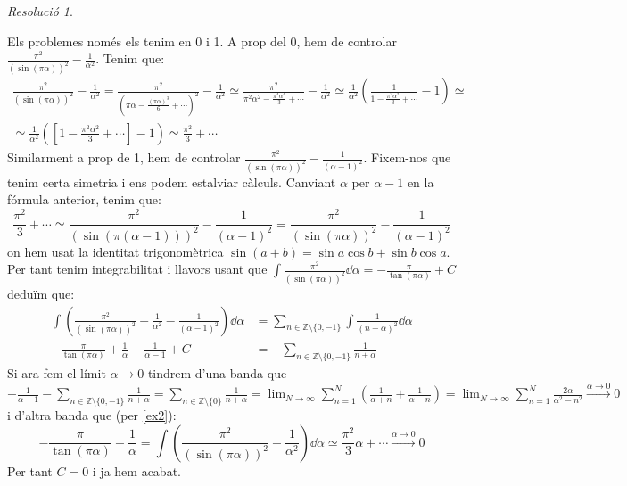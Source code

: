 \documentclass[10pt,a4paper]{article}
\newcommand{\ZZ}{\ensuremath{\mathbb{Z}}} %
\theoremstyle{definition}
\theoremstyle{remark}
\newtheorem*{res}{Resolució}
\begin{document}
\begin{res}
\begin{enumerate}
          Els problemes només els tenim en 0 i 1. A prop del 0, hem de controlar $\frac{\pi^2}{{(\sin(\pi\alpha))}^2}-\frac{1}{\alpha^2}$. Tenim que:
          \begin{multline}\label{ex2}
            \frac{\pi^2}{{(\sin(\pi\alpha))}^2}-\frac{1}{\alpha^2}= \frac{\pi^2}{{(\pi\alpha-\frac{{(\pi\alpha)}^3}{6}+\cdots)}^2}-\frac{1}{\alpha^2}\simeq \frac{\pi^2}{\pi^2\alpha^2-\frac{\pi^4\alpha^4}{3}+\cdots}-\frac{1}{\alpha^2}\simeq \frac{1}{\alpha^2}\left(\frac{1}{1-\frac{\pi^2\alpha^2}{3}+\cdots}-1\right)\simeq \\\simeq \frac{1}{\alpha^2}\left(\left[1-\frac{\pi^2\alpha^2}{3}+\cdots\right]-1\right)\simeq \frac{\pi^2}{3}+\cdots
          \end{multline}
          Similarment a prop de 1, hem de controlar $\frac{\pi^2}{{(\sin(\pi\alpha))}^2}-\frac{1}{{(\alpha-1)}^2}$. Fixem-nos que tenim certa simetria i ens podem estalviar càlculs. Canviant $\alpha$ per $\alpha-1$ en la fórmula anterior, tenim que:
          $$\frac{\pi^2}{3}+\cdots\simeq\frac{\pi^2}{{(\sin(\pi(\alpha-1)))}^2}-\frac{1}{{(\alpha-1)}^2}=\frac{\pi^2}{{(\sin(\pi\alpha))}^2}-\frac{1}{{(\alpha-1)}^2}$$
          on hem usat la identitat trigonomètrica $\sin(a+b)=\sin{a}\cos{b}+\sin{b}\cos{a}$. Per tant tenim integrabilitat i llavors usant que $\int\frac{\pi^2}{{(\sin(\pi\alpha))}^2}\dd{\alpha}=-\frac{\pi}{\tan(\pi\alpha)}+C$ deduïm que:
          \begin{align*}
            \int\left(\frac{\pi^2}{{(\sin(\pi\alpha))}^2}-\frac{1}{\alpha^2}-\frac{1}{{(\alpha-1)^2}}\right)\dd{\alpha} & =\sum_{n\in\ZZ\setminus\{0,-1\}}\int\frac{1}{{(n+\alpha)}^2}\dd{\alpha} \\
            -\frac{\pi}{\tan(\pi\alpha)}+\frac{1}{\alpha}+\frac{1}{\alpha-1}+C                                          & =-\sum_{n\in\ZZ\setminus\{0,-1\}}\frac{1}{n+\alpha}
          \end{align*}
          Si ara fem el límit $\alpha\to0$ tindrem d'una banda que $-\frac{1}{\alpha-1}-\sum_{n\in\ZZ\setminus\{0,-1\}}\frac{1}{n+\alpha}=\sum_{n\in\ZZ\setminus\{0\}}\frac{1}{n+\alpha}=\lim_{N\to\infty}\sum_{n=1}^{N}\left(\frac{1}{\alpha+n}+\frac{1}{\alpha-n}\right)=\lim_{N\to\infty}\sum_{n=1}^{N}\frac{2\alpha}{\alpha^2-n^2}\overset{\alpha\to 0}{\longrightarrow}0$ i d'altra banda que (per \eqref{ex2}):
          $$-\frac{\pi}{\tan(\pi\alpha)}+\frac{1}{\alpha}=\int\left(\frac{\pi^2}{{(\sin(\pi\alpha))}^2}-\frac{1}{\alpha^2}\right)\dd{\alpha}\simeq\frac{\pi^2}{3}\alpha+\cdots\overset{\alpha\to 0}{\longrightarrow}0$$
          Per tant $C=0$ i ja hem acabat.
  \end{enumerate}
\end{res}
\end{document}
